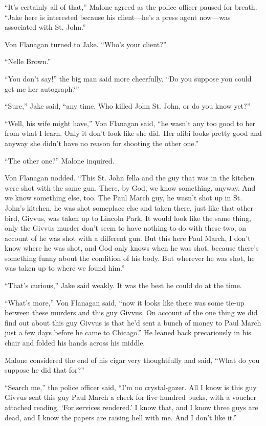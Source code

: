 \documentclass{novel}
\begin{document}
“It’s certainly all of that,” Malone agreed as the police officer paused for breath. “Jake here is interested because his client—he’s a press agent now—was associated with St. John.”

Von Flanagan turned to Jake. “Who’s your client?”

“Nelle Brown.”

“You don’t say!” the big man said more cheerfully. “Do you suppose you could get me her autograph?”

“Sure,” Jake said, “any time. Who killed John St. John, or do you know yet?”

“Well, his wife might have,” Von Flanagan said, “he wasn’t any too good to her from what I learn. Only it don’t look like she did. Her alibi looks pretty good and anyway she didn’t have no reason for shooting the other one.”

“The other one?” Malone inquired.

Von Flanagan nodded. “This St. John fella and the guy that was in the kitchen were shot with the same gun. There, by God, we know something, anyway. And we know something else, too. The Paul March guy, he wasn’t shot up in St. John’s kitchen, he was shot someplace else and taken there, just like that other bird, Givvus, was taken up to Lincoln Park. It would look like the same thing, only the Givvus murder don’t seem to have nothing to do with these two, on account of he was shot with a different gun. But this here Paul March, I don’t know where he was shot, and God only knows when he was shot, because there’s something funny about the condition of his body. But wherever he was shot, he was taken up to where we found him.”

“That’s curious,” Jake said weakly. It was the best he could do at the time.

“What’s more,” Von Flanagan said, “now it looks like there was some tie-up between these murders and this guy Givvus. On account of the one thing we did find out about this guy Givvus is that he’d sent a bunch of money to Paul March just a few days before he came to Chicago.” He leaned back precariously in his chair and folded his hands across his middle.

Malone considered the end of his cigar very thoughtfully and said, “What do you suppose he did that for?”

“Search me,” the police officer said, “I’m no crystal-gazer. All I know is this guy Givvus sent this guy Paul March a check for five hundred bucks, with a voucher attached reading, ‘For services rendered.’ I know that, and I know three guys are dead, and I know the papers are raising hell with me. And I don’t like it.”
\end{document}
